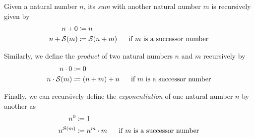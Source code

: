\begin{definition}
    Given a natural number $n$,
    its \emph{sum} with another natural number $m$ is recursively given by
    \begin{align*}
        n + 0 &\defn n\\
        n + \successor{m} &\defn \successor{n + m}~~~~\text{ if } m \text{ is a successor number}
    \end{align*}

    Similarly, we define the \emph{product} of two natural numbers $n$ and $m$ recursively by
    \begin{align*}
        n \cdot 0 &\defn 0\\
        n \cdot \successor{m} &\defn \pn*{n + m} + n~~~~\text{ if } m \text{ is a successor number}
    \end{align*}

    Finally, we can recursively define the \emph{exponentiation} of one natural number $n$ by another as
    \begin{align*}
        n^{0} &\defn 1\\
        n^{\successor{m}} &\defn n^{m} \cdot m~~~~\text{ if } m \text{ is a successor number}
    \end{align*}
\end{definition}

